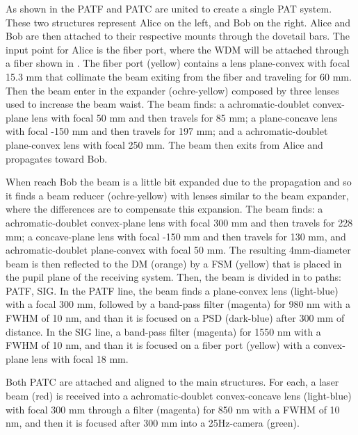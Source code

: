 
As shown in the  PATF and PATC are united to create a single PAT system. These two structures represent Alice on the left, and Bob on the right. Alice and Bob are then attached to their respective mounts through the dovetail bars.
The input point for Alice is the fiber port, where the WDM will be attached through a fiber shown in . The fiber port (yellow) contains a lens plane-convex with focal 15.3 mm that collimate the beam exiting from the fiber and traveling for 60 mm. Then the beam enter in the expander (ochre-yellow) composed by three lenses used to increase the beam waist. The beam finds: a achromatic-doublet convex-plane lens with focal 50 mm and then travels for 85 mm; a plane-concave lens with focal -150 mm and then travels for 197 mm; and a achromatic-doublet plane-convex lens with focal 250 mm. The beam then exits from Alice and propagates toward Bob.

When reach Bob the beam is a little bit expanded due to the propagation and so it finds a beam reducer (ochre-yellow) with lenses similar to the beam expander, where the differences are to compensate this expansion. The beam finds: a achromatic-doublet convex-plane lens with focal 300 mm and then travels for 228 mm; a concave-plane lens with focal -150 mm and then travels for 130 mm, and achromatic-doublet plane-convex with focal 50 mm. The resulting 4mm-diameter beam is then reflected to the DM (orange) by a FSM (yellow) that is placed in the pupil plane of the receiving system. Then, the beam is divided in to paths: PATF, SIG.
In the PATF line, the beam finds a plane-convex lens (light-blue) with a focal 300 mm, followed by a band-pass filter (magenta) for 980 nm with a FWHM of 10 nm, and than it is focused on a PSD (dark-blue) after 300 mm of distance.
In the SIG line, a band-pass filter (magenta) for 1550 nm with a FWHM of 10 nm, and than it is focused on a fiber port (yellow) with a convex-plane lens with focal 18 mm.

Both PATC are attached and aligned to the main structures. For each, a laser beam (red) is received into a achromatic-doublet convex-concave lens (light-blue) with focal 300 mm through a filter (magenta) for 850 nm with a FWHM of 10 nm, and then it is focused after 300 mm into a 25Hz-camera (green).

